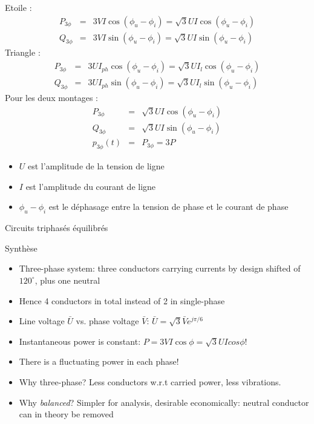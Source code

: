 
\begin{frame}{}
	Etoile :
	{\small \begin{eqnarray*}
			P_{3\phi}& =& 3VI\cos(\phi_u-\phi_i)= \sqrt{3}UI\cos(\phi_u-\phi_i)\\
			Q_{3\phi}& = & 3VI\sin(\phi_u-\phi_i)= \sqrt{3}UI\sin(\phi_u-\phi_i)
		\end{eqnarray*}}
		Triangle :
		{\small \begin{eqnarray*}
				P_{3\phi}& =& 3UI_{ph}\cos(\phi_u-\phi_i)= \sqrt{3}UI_{l}\cos(\phi_u-\phi_i)\\
				Q_{3\phi}& = & 3UI_{ph}\sin(\phi_u-\phi_i)= \sqrt{3}UI_{l}\sin(\phi_u-\phi_i)
			\end{eqnarray*}}
Pour les deux montages :
{\small \begin{eqnarray*}
		P_{3\phi}& =& \sqrt{3}UI\cos(\phi_u-\phi_i)\\
		Q_{3\phi}& = & \sqrt{3}UI\sin(\phi_u-\phi_i)\\
		p_{3\phi}(t)& = & P_{3\phi}=3P
	\end{eqnarray*}}
	\begin{itemize}
		\item $U$ est l'amplitude de la tension de ligne
		\item $I$ est l'amplitude du courant de ligne
		\item $\phi_u-\phi_i$ est le déphasage entre la tension de phase et le
		courant de phase
	\end{itemize}
\end{frame}


\begin{frame} {Circuits triphasés équilibrés}
	\begin{block}{Synthèse}
		\begin{itemize}
			\item Three-phase system: three conductors carrying currents by design shifted of $120^\circ$,  plus one neutral \item Hence 4 conductors in total instead of 2 in single-phase
			\item Line voltage $\bar{U}$ vs. phase voltage $\bar{V}$: $\bar{U}=\sqrt{3} \bar{V} e^{j \pi / 6}$			
			\item Instantaneous power is constant: $P=3VI \cos \phi  = \sqrt{3} UI cos \phi$!
			\item There is a fluctuating power in each phase!
			\item Why three-phase? Less conductors w.r.t carried power, less vibrations.
			\item Why \textit{balanced}? Simpler for analysis, desirable economically: neutral conductor can in theory be removed
		\end{itemize}
	\end{block}
\end{frame}


